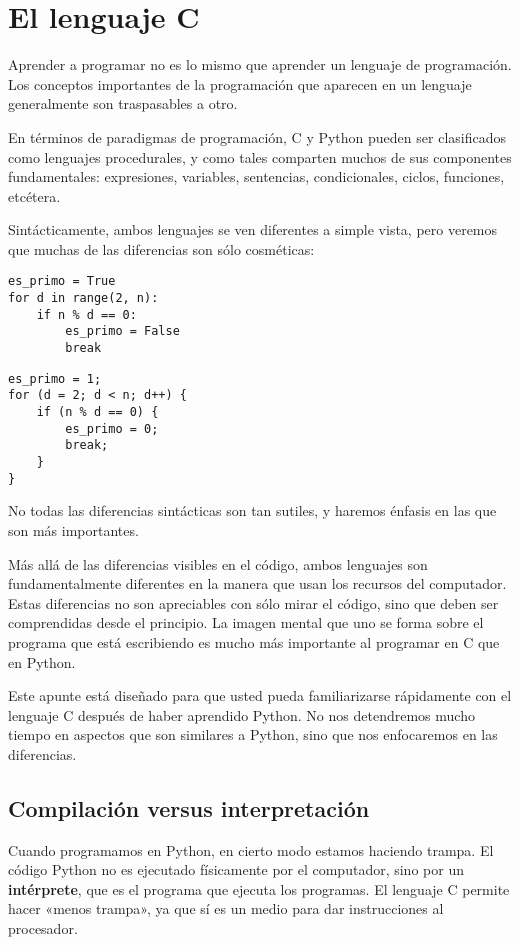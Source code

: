 \section{El lenguaje C}

Aprender a programar no es lo mismo que aprender un lenguaje de
programación. Los conceptos importantes de la programación que aparecen
en un lenguaje generalmente son traspasables a otro.

En términos de paradigmas de programación, C y Python pueden ser
clasificados como lenguajes procedurales, y como tales comparten muchos
de sus componentes fundamentales: expresiones, variables, sentencias,
condicionales, ciclos, funciones, etcétera.

Sintácticamente, ambos lenguajes se ven diferentes a simple vista, pero
veremos que muchas de las diferencias son sólo cosméticas:

\begin{lstlisting}
es_primo = True
for d in range(2, n):
    if n % d == 0:
        es_primo = False
        break
\end{lstlisting}

\begin{lstlisting}
es_primo = 1;
for (d = 2; d < n; d++) {
    if (n % d == 0) {
        es_primo = 0;
        break;
    }
}
\end{lstlisting}

No todas las diferencias sintácticas son tan sutiles, y haremos énfasis
en las que son más importantes.

Más allá de las diferencias visibles en el código, ambos lenguajes son
fundamentalmente diferentes en la manera que usan los recursos del
computador. Estas diferencias no son apreciables con sólo mirar el
código, sino que deben ser comprendidas desde el principio. La imagen
mental que uno se forma sobre el programa que está escribiendo es mucho
más importante al programar en C que en Python.

Este apunte está diseñado para que usted pueda familiarizarse
rápidamente con el lenguaje C después de haber aprendido Python. No nos
detendremos mucho tiempo en aspectos que son similares a Python, sino
que nos enfocaremos en las diferencias.

\subsection{Compilación versus interpretación}

Cuando programamos en Python, en cierto modo estamos haciendo trampa. El
código Python no es ejecutado físicamente por el computador, sino por un
\textbf{intérprete}, que es el programa que ejecuta los programas. El
lenguaje C permite hacer «menos trampa», ya que sí es un medio para dar
instrucciones al procesador.

